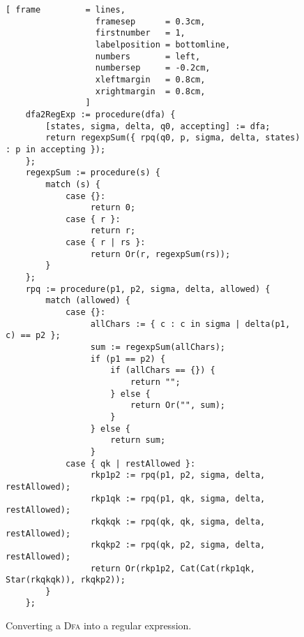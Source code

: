\begin{figure}[!ht]
\centering
\begin{Verbatim}[ frame         = lines, 
                  framesep      = 0.3cm, 
                  firstnumber   = 1,
                  labelposition = bottomline,
                  numbers       = left,
                  numbersep     = -0.2cm,
                  xleftmargin   = 0.8cm,
                  xrightmargin  = 0.8cm,
                ]
    dfa2RegExp := procedure(dfa) {
        [states, sigma, delta, q0, accepting] := dfa;
        return regexpSum({ rpq(q0, p, sigma, delta, states) : p in accepting });
    };
    regexpSum := procedure(s) {
        match (s) {
            case {}:
                 return 0;
            case { r }:
                 return r;
            case { r | rs }:
                 return Or(r, regexpSum(rs));
        }
    };
    rpq := procedure(p1, p2, sigma, delta, allowed) {
        match (allowed) {
            case {}: 
                 allChars := { c : c in sigma | delta(p1, c) == p2 };
                 sum := regexpSum(allChars);
                 if (p1 == p2) {
                     if (allChars == {}) {
                         return "";
                     } else {
                         return Or("", sum);
                     }
                 } else {
                     return sum;
                 }
            case { qk | restAllowed }:
                 rkp1p2 := rpq(p1, p2, sigma, delta, restAllowed);
                 rkp1qk := rpq(p1, qk, sigma, delta, restAllowed);
                 rkqkqk := rpq(qk, qk, sigma, delta, restAllowed);
                 rkqkp2 := rpq(qk, p2, sigma, delta, restAllowed);
                 return Or(rkp1p2, Cat(Cat(rkp1qk, Star(rkqkqk)), rkqkp2));
        }    
    };
\end{Verbatim}
\vspace*{-0.3cm}
\caption{Converting a \textsc{Dfa} into a regular expression.}
\label{fig:dfa-2-regexp.stlx}
\end{figure}

